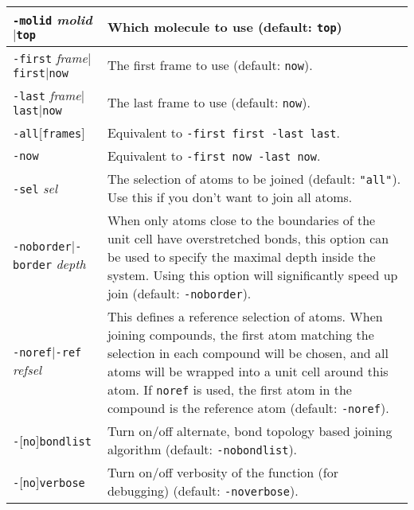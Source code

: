 \documentclass[a4paper, DIV12]{scrartcl}
\begin{document}
\begin{tabular}{|p{}|p{}|}
\hline

\texttt{-molid} \textit{molid}$|$\texttt{top}
& Which molecule to use (default: \texttt{top})
\\ \hline

\texttt{-first} \textit{frame}$|$\texttt{first}$|$\texttt{now}
& The first frame to use (default: \texttt{now}). 
\\ \hline

\texttt{-last} \textit{frame}$|$\texttt{last}$|$\texttt{now}
& The last frame to use (default: \texttt{now}).
\\ \hline

\texttt{-all}[\texttt{frames}]
& Equivalent to \texttt{-first first -last last}.
\\ \hline

\texttt{-now}
& Equivalent to \texttt{-first now -last now}.
\\ \hline

\texttt{-sel} \textit{sel}
& The selection of atoms to be joined (default: \texttt{"all"}). Use
this if you don't want to join all atoms.
\\ \hline

\texttt{-noborder}$|$\texttt{-border} \textit{depth}
& When only atoms close to the boundaries of the unit cell have
overstretched bonds, this option can be used to specify the maximal
depth inside the system. Using this option will significantly speed up
join (default: \texttt{-noborder}).
\\ \hline

\texttt{-noref}$|$\texttt{-ref} \textit{refsel}
& This defines a reference selection of atoms. When joining compounds,
the first atom matching the selection in each compound will be chosen,
and all atoms will be wrapped into a unit cell around this atom. If
\texttt{noref} is used, the first atom in the compound is the
reference atom (default: \texttt{-noref}).
\\ \hline

\texttt{-}[\texttt{no}]\texttt{bondlist}
& Turn on/off alternate, bond topology based joining algorithm (default:
\texttt{-nobondlist}).
\\ \hline

\texttt{-}[\texttt{no}]\texttt{verbose}
& Turn on/off verbosity of the function (for debugging) (default:
\texttt{-noverbose}).
\\ \hline
\end{tabular}
\end{document}
